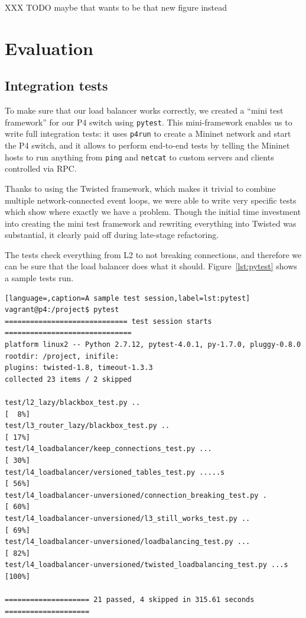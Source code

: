 \documentclass[11pt,oneside,a4paper]{article}
\begin{document}
XXX TODO maybe that wants to be that new figure instead

\section{Evaluation}
\subsection{Integration tests}

To make sure that our load balancer works correctly, we created a ``mini test
framework'' for our P4 switch using \texttt{pytest}\cite{pytest}.
This mini-framework enables us to write full integration tests: it uses
\texttt{p4run} to create a Mininet network and start the P4 switch, and it
allows to perform end-to-end tests by telling the Mininet hosts to run anything
from \texttt{ping} and \texttt{netcat} to custom servers and clients controlled
via RPC.

Thanks to using the Twisted framework, which makes it trivial to combine
multiple network-connected event loops, we were able to write very specific
tests which show where exactly we have a problem.
Though the initial time investment into creating the mini test framework and
rewriting everything into Twisted was substantial, it clearly paid off during
late-stage refactoring.

The tests check everything from L2 to not breaking connections, and therefore we
can be sure that the load balancer does what it should.
Figure~\ref{lst:pytest} shows a sample tests run.

\begin{lstlisting}[language=,caption=A sample test session,label=lst:pytest]
vagrant@p4:/project$ pytest                                          
============================= test session starts ==============================
platform linux2 -- Python 2.7.12, pytest-4.0.1, py-1.7.0, pluggy-0.8.0          
rootdir: /project, inifile:                                                     
plugins: twisted-1.8, timeout-1.3.3                                             
collected 23 items / 2 skipped                                                  
                                                                                
test/l2_lazy/blackbox_test.py ..                                         [  8%] 
test/l3_router_lazy/blackbox_test.py ..                                  [ 17%] 
test/l4_loadbalancer/keep_connections_test.py ...                        [ 30%] 
test/l4_loadbalancer/versioned_tables_test.py .....s                     [ 56%] 
test/l4_loadbalancer-unversioned/connection_breaking_test.py .           [ 60%] 
test/l4_loadbalancer-unversioned/l3_still_works_test.py ..               [ 69%] 
test/l4_loadbalancer-unversioned/loadbalancing_test.py ...               [ 82%] 
test/l4_loadbalancer-unversioned/twisted_loadbalancing_test.py ...s      [100%] 
                                                                                
==================== 21 passed, 4 skipped in 315.61 seconds ====================
\end{lstlisting}
\end{document}
